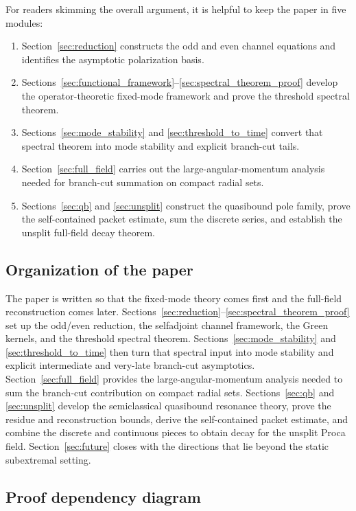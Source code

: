 \documentclass[12pt]{article}
\numberwithin{equation}{section}
\theoremstyle{plain}
\theoremstyle{definition}
\theoremstyle{remark}
\begin{document}
For readers skimming the overall argument, it is helpful to keep the paper in five modules:
\begin{enumerate}[label=\textnormal{(\arabic*)}]
   \item Section~\ref{sec:reduction} constructs the odd and even channel equations and identifies the asymptotic polarization basis.
   \item Sections~\ref{sec:functional_framework}--\ref{sec:spectral_theorem_proof} develop the operator-theoretic fixed-mode framework and prove the threshold spectral theorem.
   \item Sections~\ref{sec:mode_stability} and \ref{sec:threshold_to_time} convert that spectral theorem into mode stability and explicit branch-cut tails.
   \item Section~\ref{sec:full_field} carries out the large-angular-momentum analysis needed for branch-cut summation on compact radial sets.
   \item Sections~\ref{sec:qb} and \ref{sec:unsplit} construct the quasibound pole family, prove the self-contained packet estimate, sum the discrete series, and establish the unsplit full-field decay theorem.
\end{enumerate}

\subsection{Organization of the paper}

The paper is written so that the fixed-mode theory comes first and the full-field reconstruction comes later.  Sections~\ref{sec:reduction}--\ref{sec:spectral_theorem_proof} set up the odd/even reduction, the selfadjoint channel framework, the Green kernels, and the threshold spectral theorem.  Sections~\ref{sec:mode_stability} and \ref{sec:threshold_to_time} then turn that spectral input into mode stability and explicit intermediate and very-late branch-cut asymptotics.  Section~\ref{sec:full_field} provides the large-angular-momentum analysis needed to sum the branch-cut contribution on compact radial sets.  Sections~\ref{sec:qb} and \ref{sec:unsplit} develop the semiclassical quasibound resonance theory, prove the residue and reconstruction bounds, derive the self-contained packet estimate, and combine the discrete and continuous pieces to obtain decay for the unsplit Proca field.  Section~\ref{sec:future} closes with the directions that lie beyond the static subextremal setting.

\subsection{Proof dependency diagram}
\end{document}
